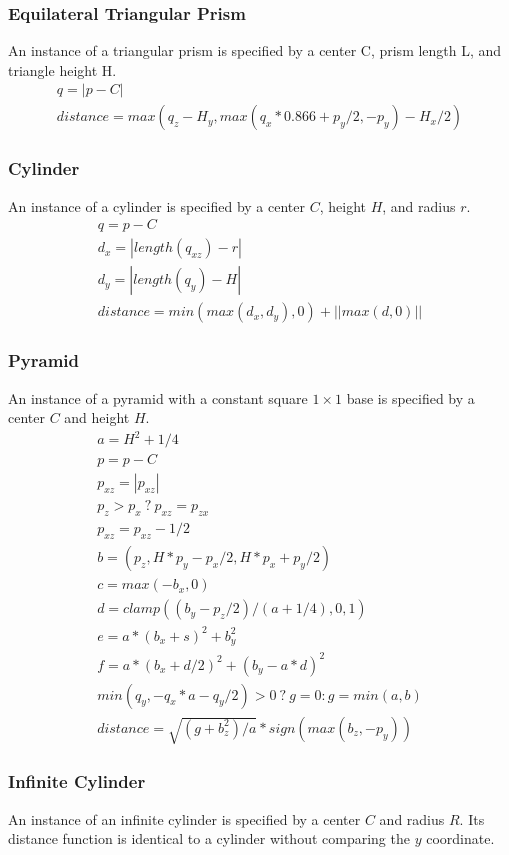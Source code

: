 \documentclass[sigconf, nonacm]{acmart}
\begin{document}
\subsubsection{Equilateral Triangular Prism}

An instance of a triangular prism is specified by a center C, prism length L, and triangle height H.
\begin{gather*}
q = |p - C| \\
distance = max(q_z-H_y,max(q_x*0.866+p_y/2,-p_y)-H_x/2)
\end{gather*}

\subsubsection{Cylinder}

An instance of a cylinder is specified by a center $C$, height $H$, and radius $r$.
\begin{gather*}
q = p - C\\
d_x = |length(q_{xz}) - r|\\
d_y = |length(q_y) - H|\\
distance = min(max(d_x, d_y), 0) + ||max(d,0)||
\end{gather*}

\subsubsection{Pyramid}

An instance of a pyramid with a constant square $1\times1$ base is specified by a center $C$ and height $H$.
\begin{gather*}
a = H^2 + 1/4\\
p = p - C\\
p_{xz} = |p_{xz}|\\
p_z > p_x\ ?\ p_{xz} = p_{zx}\\
p_{xz} = p_{xz} - 1/2\\
b = (p_z, H*p_y - p_x/2, H*p_x + p_y/2)\\
c = max(-b_x,0)\\
d = clamp((b_y-p_z/2)/(a+1/4), 0, 1)\\
e = a*(b_x+s)^2 + b_y^2\\
f = a*(b_x+d/2)^2 +(b_y-a*d)^2\\
min(q_y,-q_x*a-q_y/2) > 0\ ?\ g = 0 : g = min(a,b)\\
distance = \sqrt{(g+b_z^2)/a} * sign(max(b_z,-p_y))
\end{gather*}

\subsubsection{Infinite Cylinder}
An instance of an infinite cylinder is specified by a center $C$ and radius $R$. Its distance function is identical to a cylinder without comparing the $y$ coordinate.
\end{document}
